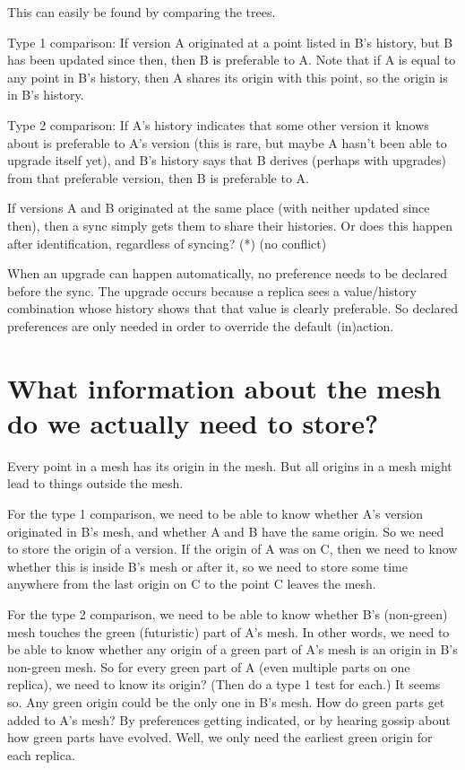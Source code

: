 \documentclass{book}
\begin{document}
This can easily be found by comparing the trees.

Type 1 comparison:
If version A originated at a point listed in B's history, but B has been updated since then, then B is preferable to A.
Note that if A is equal to any point in B's history, then A shares its origin with this point, so the origin is in B's history.

Type 2 comparison:
If A's history indicates that some other version it knows about is preferable to A's version (this is rare, but maybe A hasn't been able to upgrade itself yet), and B's history says that B derives (perhaps with upgrades) from that preferable version, then B is preferable to A.

If versions A and B originated at the same place (with neither updated since then), then a sync simply gets them to share their histories.  Or does this happen after identification, regardless of syncing? (*) (no conflict)

When an upgrade can happen automatically, no preference needs to be declared before the sync.  The upgrade occurs because a replica sees a value/history combination whose history shows that that value is clearly preferable.  So declared preferences are only needed in order to override the default (in)action.

\section{What information about the mesh do we actually need to store?}

Every point in a mesh has its origin in the mesh.  But all origins in a mesh might lead to things outside the mesh.

For the type 1 comparison, we need to be able to know whether A's version originated in B's mesh, and whether A and B have the same origin.  So we need to store the origin of a version.  If the origin of A was on C, then we need to know whether this is inside B's mesh or after it, so we need to store some time anywhere from the last origin on C to the point C leaves the mesh.

For the type 2 comparison, we need to be able to know whether B's (non-green) mesh touches the green (futuristic) part of A's mesh.  In other words, we need to be able to know whether any origin of a green part of A's mesh is an origin in B's non-green mesh.  So for every green part of A (even multiple parts on one replica), we need to know its origin?  (Then do a type 1 test for each.)  It seems so.  Any green origin could be the only one in B's mesh.  How do green parts get added to A's mesh?  By preferences getting indicated, or by hearing gossip about how green parts have evolved.  Well, we only need the earliest green origin for each replica.
\end{document}
